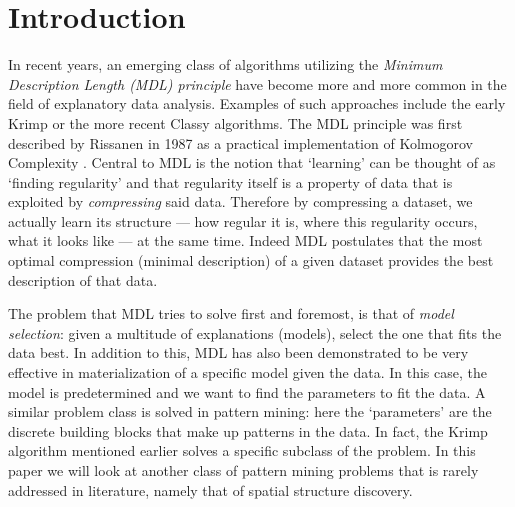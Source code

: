 \documentclass{llncs}
\begin{document}
\section{Introduction}

In recent years, an emerging class of algorithms utilizing the \emph{Minimum Description Length (MDL) principle} \cite{rissanenmdl,grunwaldmdl} have become more and more common in the field of explanatory data analysis. Examples of such approaches include the early Krimp \cite{krimp} or the more recent Classy \cite{classy} algorithms. The  MDL principle was first described by Rissanen in 1987 \cite{rissanenmdl} as a practical implementation of Kolmogorov Complexity \cite{kolmogorov}. Central to MDL is the notion that `learning' can be thought of as `finding regularity' and that regularity itself is a property of data that is exploited by \emph{compressing} said data. Therefore by compressing a dataset, we actually learn its structure --- how regular it is, where this regularity occurs, what it looks like --- at the same time. Indeed MDL postulates that the most optimal compression (minimal description) of a given dataset provides the best description of that data. 

The problem that MDL tries to solve first and foremost, is that of \emph{model selection}: given a multitude of explanations (models), select the one that fits the data best. In addition to this, MDL has also been demonstrated to be very effective in materialization of a specific model given the data. In this case, the model is predetermined and we want to find the parameters to fit the data. A similar problem class is solved in pattern mining: here the `parameters' are the discrete building blocks that make up patterns in the data. In fact, the Krimp algorithm mentioned earlier solves a specific subclass of the problem. In this paper we will look at another class of pattern mining problems that is rarely addressed in literature, namely that of spatial structure discovery.
\end{document}
